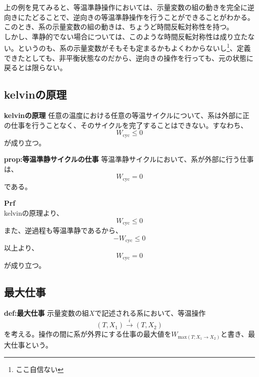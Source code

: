 \documentclass[a4paper,11pt]{jsarticle}
\begin{document}
上の例を見てみると、等温準静操作においては、示量変数の組の動きを完全に逆向きにたどることで、逆向きの等温準静操作を行うことができることがわかる。このとき、系の示量変数の組の動きは、ちょうど時間反転対称性を持つ。\\
しかし、準静的でない場合については、このような時間反転対称性は成り立たない。というのも、系の示量変数がそもそも定まるかもよくわからないし\footnote{ここ自信ない}、定義できたとしても、非平衡状態なのだから、逆向きの操作を行っても、元の状態に戻るとは限らない。


\subsection{kelvinの原理}
\begin{itembox}[l]{\textbf{kelvinの原理}}
    任意の温度における任意の等温サイクルについて、系は外部に正の仕事を行うことなく、そのサイクルを完了することはできない。すなわち、
    \begin{equation}
        W_{\text{cyc}} \leq 0
    \end{equation}
    が成り立つ。
\end{itembox}

\begin{itembox}[l]{\textbf{prop:等温準静サイクルの仕事}}
    等温準静サイクルにおいて、系が外部に行う仕事は、
    \begin{equation}
        W_{\text{cyc}} = 0
    \end{equation}
    である。
\end{itembox}
\textbf{Prf}\\
kelvinの原理より、
\begin{equation}
    W_{\text{cyc}} \leq 0
\end{equation}
また、逆過程も等温準静であるから、
\begin{equation}
    -W_{\text{cyc}} \leq 0
\end{equation}
以上より、
\begin{equation}
    W_{\text{cyc}} = 0
\end{equation}
が成り立つ。\\

\subsection{最大仕事}
\begin{itembox}[l]{\textbf{def:最大仕事}}
    示量変数の組$X$で記述される系において、等温操作
    \begin{equation}
        (T,X_1) \xrightarrow{i} (T,X_2)
    \end{equation}
    を考える。操作の間に系が外界にする仕事の最大値を$W_{\text{max}(T;X_1\rightarrow X_2)}$と書き、最大仕事という。
\end{itembox}
\end{document}
